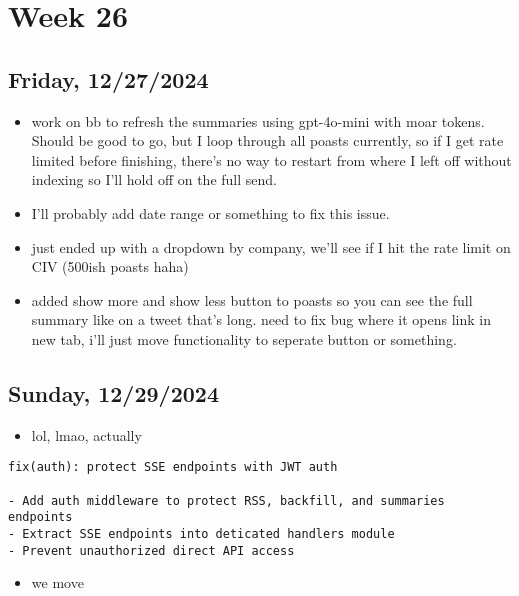 \newpage
\section{Week 26}

\subsection{Friday, 12/27/2024}
\begin{itemize}
    \item work on bb to refresh the summaries using gpt-4o-mini with moar
        tokens. Should be good to go, but I loop through all poasts currently,
        so if I get rate limited before finishing, there's no way to restart
        from where I left off without indexing so I'll hold off on the full
        send.
    \item I'll probably add date range or something to fix this issue.
    \item just ended up with a dropdown by company, we'll see if I hit the rate
        limit on CIV (500ish poasts haha)
    \item added show more and show less button to poasts so you can see the full
        summary like on a tweet that's long. need to fix bug where it opens link
        in new tab, i'll just move functionality to seperate button or
        something.
\end{itemize}

\subsection{Sunday, 12/29/2024}

\begin{itemize}
    \item lol, lmao, actually
\end{itemize}

\begin{verbatim}
fix(auth): protect SSE endpoints with JWT auth

- Add auth middleware to protect RSS, backfill, and summaries endpoints
- Extract SSE endpoints into deticated handlers module
- Prevent unauthorized direct API access
\end{verbatim}

\begin{itemize}
    \item we move
\end{itemize}

